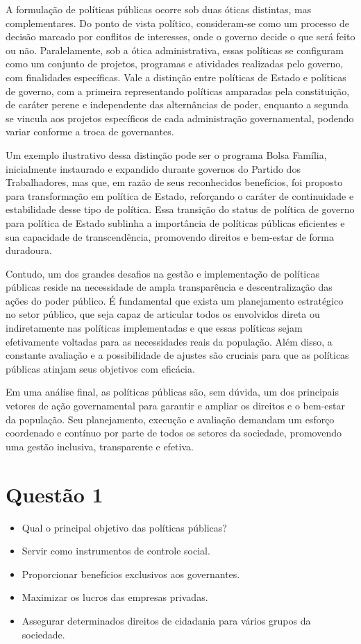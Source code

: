 \documentclass[
   article,       
   12pt,          
   oneside,       
   a4paper,       
   english,       
   brazil,        
   sumario=tradicional
   ]{abntex2}
\begin{document}
A formulação de políticas públicas ocorre sob duas óticas distintas, mas complementares. Do ponto de vista político, consideram-se como um processo de decisão marcado por conflitos de interesses, onde o governo decide o que será feito ou não. Paralelamente, sob a ótica administrativa, essas políticas se configuram como um conjunto de projetos, programas e atividades realizadas pelo governo, com finalidades específicas. Vale a distinção entre políticas de Estado e políticas de governo, com a primeira representando políticas amparadas pela constituição, de caráter perene e independente das alternâncias de poder, enquanto a segunda se vincula aos projetos específicos de cada administração governamental, podendo variar conforme a troca de governantes.

Um exemplo ilustrativo dessa distinção pode ser o programa Bolsa Família, inicialmente instaurado e expandido durante governos do Partido dos Trabalhadores, mas que, em razão de seus reconhecidos benefícios, foi proposto para transformação em política de Estado, reforçando o caráter de continuidade e estabilidade desse tipo de política. Essa transição do status de política de governo para política de Estado sublinha a importância de políticas públicas eficientes e sua capacidade de transcendência, promovendo direitos e bem-estar de forma duradoura.

Contudo, um dos grandes desafios na gestão e implementação de políticas públicas reside na necessidade de ampla transparência e descentralização das ações do poder público. É fundamental que exista um planejamento estratégico no setor público, que seja capaz de articular todos os envolvidos direta ou indiretamente nas políticas implementadas e que essas políticas sejam efetivamente voltadas para as necessidades reais da população. Além disso, a constante avaliação e a possibilidade de ajustes são cruciais para que as políticas públicas atinjam seus objetivos com eficácia.

Em uma análise final, as políticas públicas são, sem dúvida, um dos principais vetores de ação governamental para garantir e ampliar os direitos e o bem-estar da população. Seu planejamento, execução e avaliação demandam um esforço coordenado e contínuo por parte de todos os setores da sociedade, promovendo uma gestão inclusiva, transparente e efetiva.
\section{Questão 1}
\begin{itemize}
    \item Qual o principal objetivo das políticas públicas?
    \item Servir como instrumentos de controle social.
    \item Proporcionar benefícios exclusivos aos governantes.
    \item Maximizar os lucros das empresas privadas.
    \item Assegurar determinados direitos de cidadania para vários grupos da sociedade.
\end{itemize}
\end{document}

